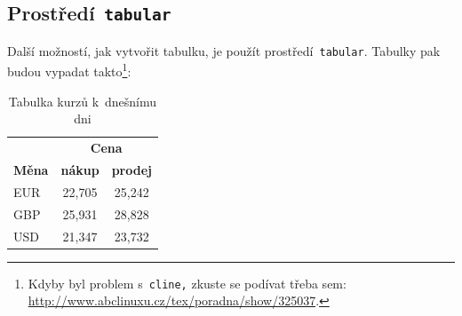 \documentclass[a4paper, 11pt]{article}
\begin{document}
    \subsection{Prostředí\texttt{ tabular}}
	Další možností, jak vytvořit tabulku, je použít prostředí\texttt{ tabular}. Tabulky pak budou vypadat takto\footnote{Kdyby byl problem s\texttt{ cline,} zkuste se podívat třeba sem: \href{http://www.abclinuxu.cz/tex/poradna/show/325037}{http://www.abclinuxu.cz/tex/poradna/show/325037}.}:
 
	\bigskip
 
	\begin{table}[h]
		\centering
		\begin{tabular}{|l|c|c|}
			\hline & \multicolumn{2}{|c|}{\textbf{Cena}} \\ \cline{2-3} 
                \textbf{Měna} & \textbf{nákup} & \textbf{prodej} \\ \hline
			EUR	& 22,705 & 25,242 \\
			GBP	& 25,931 & 28,828 \\
			USD	& 21,347 & 23,732 \\ \hline
		\end{tabular}
		\caption{Tabulka kurzů k~dnešnímu dni}
            \label{table:kurzy}
	\end{table}

	\bigskip
 
\end{document}
